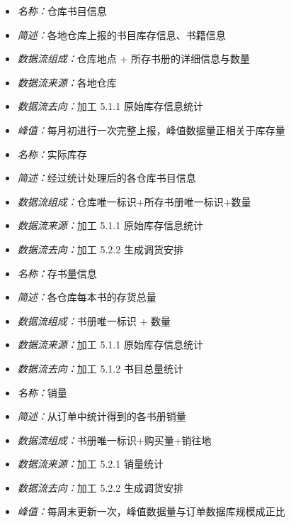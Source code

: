 \vspace{-1mm}

\begin{itemize}
\item \textit{名称：}仓库书目信息
	\item \textit{简述：}各地仓库上报的书目库存信息、书籍信息
	\item \textit{数据流组成：}仓库地点 + 所存书册的详细信息与数量
	\item \textit{数据流来源：}各地仓库
	\item \textit{数据流去向：}加工 5.1.1 原始库存信息统计
	\item \textit{峰值：}每月初进行一次完整上报，峰值数据量正相关于库存量
\end{itemize}

\vspace{-1mm}

\begin{itemize}
\item \textit{名称：}实际库存
	\item \textit{简述：}经过统计处理后的各仓库书目信息
	\item \textit{数据流组成：}仓库唯一标识+所存书册唯一标识+数量
	\item \textit{数据流来源：}加工 5.1.1 原始库存信息统计
	\item \textit{数据流去向：}加工 5.2.2 生成调货安排
\end{itemize}

\vspace{-1mm}

\begin{itemize}
\item \textit{名称：}存书量信息
	\item \textit{简述：}各仓库每本书的存货总量
	\item \textit{数据流组成：}书册唯一标识 + 数量
	\item \textit{数据流来源：}加工 5.1.1 原始库存信息统计
	\item \textit{数据流去向：}加工 5.1.2 书目总量统计
\end{itemize}

\vspace{-1mm}

\begin{itemize}
\item \textit{名称：}销量
	\item \textit{简述：}从订单中统计得到的各书册销量
	\item \textit{数据流组成：}书册唯一标识+购买量+销往地
	\item \textit{数据流来源：}加工 5.2.1 销量统计
	\item \textit{数据流去向：}加工 5.2.2 生成调货安排
	\item \textit{峰值：}每周末更新一次，峰值数据量与订单数据库规模成正比
\end{itemize}


